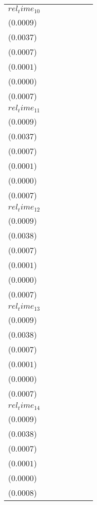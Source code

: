 \begin{tabular}{lllllll}
$rel_time_10$ & \makecell{$0.0035^{***}$ \\ ($0.0009$)} & \makecell{$0.0149^{***}$ \\ ($0.0037$)} & \makecell{$0.0007^{}$ \\ ($0.0007$)} & \makecell{$0.0000^{}$ \\ ($0.0001$)} & \makecell{$0.0000^{}$ \\ ($0.0000$)} & \makecell{$0.0031^{***}$ \\ ($0.0007$)} \\
$rel_time_11$ & \makecell{$0.0033^{***}$ \\ ($0.0009$)} & \makecell{$0.0129^{***}$ \\ ($0.0037$)} & \makecell{$-0.0012^{*}$ \\ ($0.0007$)} & \makecell{$-0.0000^{}$ \\ ($0.0001$)} & \makecell{$0.0000^{}$ \\ ($0.0000$)} & \makecell{$0.0026^{***}$ \\ ($0.0007$)} \\
$rel_time_12$ & \makecell{$0.0027^{***}$ \\ ($0.0009$)} & \makecell{$0.0107^{***}$ \\ ($0.0038$)} & \makecell{$-0.0003^{}$ \\ ($0.0007$)} & \makecell{$-0.0000^{}$ \\ ($0.0001$)} & \makecell{$0.0000^{}$ \\ ($0.0000$)} & \makecell{$0.0030^{***}$ \\ ($0.0007$)} \\
$rel_time_13$ & \makecell{$0.0032^{***}$ \\ ($0.0009$)} & \makecell{$0.0132^{***}$ \\ ($0.0038$)} & \makecell{$-0.0011^{}$ \\ ($0.0007$)} & \makecell{$-0.0001^{}$ \\ ($0.0001$)} & \makecell{$0.0000^{}$ \\ ($0.0000$)} & \makecell{$0.0032^{***}$ \\ ($0.0007$)} \\
$rel_time_14$ & \makecell{$0.0029^{***}$ \\ ($0.0009$)} & \makecell{$0.0127^{***}$ \\ ($0.0038$)} & \makecell{$-0.0014^{**}$ \\ ($0.0007$)} & \makecell{$-0.0001^{}$ \\ ($0.0001$)} & \makecell{$-0.0000^{}$ \\ ($0.0000$)} & \makecell{$0.0024^{***}$ \\ ($0.0008$)} \\

\end{tabular}

